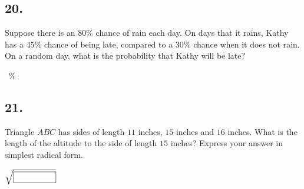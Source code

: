 \documentclass[12pt]{article}
\begin{document}
\subsection*{20.}
Suppose there is an $80\%$ chance of rain each day. On days that it rains, Kathy has a $45\%$ chance of being late, compared to a $30\%$ chance when it does not rain. On a random day, what is the probability that Kathy will be late?

\nopagebreak

\fbox{\phantom{ANSWER}}~\%

\begin{answer}
%
\end{answer}

\begin{answer}
\newpage
\end{answer}

\subsection*{21.}
Triangle $ABC$ has sides of length $11$ inches, $15$ inches and $16$ inches. What is the length of the altitude to the side of length $15$ inches? Express your answer in simplest radical form. 

\nopagebreak

\fbox{\phantom{ANSWER}}$\sqrt{\fbox{\phantom{ANSWER}}}$
\end{document}
